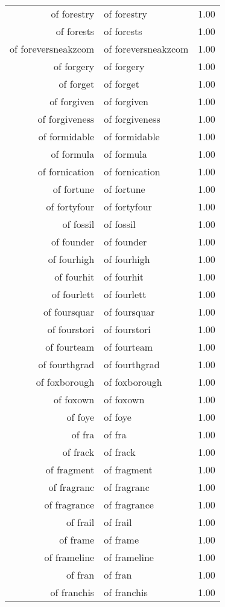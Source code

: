 \begin{table}[ht]
\begin{tabular}{rlr}
  of forestry & of forestry & 1.00 \\ 
  of forests & of forests & 1.00 \\ 
  of foreversneakzcom & of foreversneakzcom & 1.00 \\ 
  of forgery & of forgery & 1.00 \\ 
  of forget & of forget & 1.00 \\ 
  of forgiven & of forgiven & 1.00 \\ 
  of forgiveness & of forgiveness & 1.00 \\ 
  of formidable & of formidable & 1.00 \\ 
  of formula & of formula & 1.00 \\ 
  of fornication & of fornication & 1.00 \\ 
  of fortune & of fortune & 1.00 \\ 
  of fortyfour & of fortyfour & 1.00 \\ 
  of fossil & of fossil & 1.00 \\ 
  of founder & of founder & 1.00 \\ 
  of fourhigh & of fourhigh & 1.00 \\ 
  of fourhit & of fourhit & 1.00 \\ 
  of fourlett & of fourlett & 1.00 \\ 
  of foursquar & of foursquar & 1.00 \\ 
  of fourstori & of fourstori & 1.00 \\ 
  of fourteam & of fourteam & 1.00 \\ 
  of fourthgrad & of fourthgrad & 1.00 \\ 
  of foxborough & of foxborough & 1.00 \\ 
  of foxown & of foxown & 1.00 \\ 
  of foye & of foye & 1.00 \\ 
  of fra & of fra & 1.00 \\ 
  of frack & of frack & 1.00 \\ 
  of fragment & of fragment & 1.00 \\ 
  of fragranc & of fragranc & 1.00 \\ 
  of fragrance & of fragrance & 1.00 \\ 
  of frail & of frail & 1.00 \\ 
  of frame & of frame & 1.00 \\ 
  of frameline & of frameline & 1.00 \\ 
  of fran & of fran & 1.00 \\ 
  of franchis & of franchis & 1.00 \\ 

\end{tabular}
\end{table}
